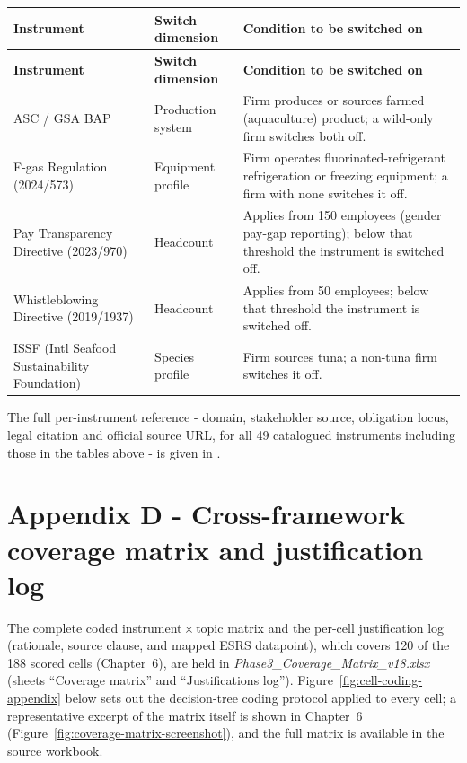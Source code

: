 \documentclass[
]{article}
\newcounter{none} %
\begin{document}
\begin{longtable}{@{}p{2.7cm}p{2.6cm}p{6.2cm}@{}}
\toprule
\textbf{Instrument} & \textbf{Switch dimension} & \textbf{Condition to be switched on} \\
\midrule
\endfirsthead
\toprule
\textbf{Instrument} & \textbf{Switch dimension} & \textbf{Condition to be switched on} \\
\midrule
\endhead
\bottomrule
\endfoot
ASC / GSA BAP & Production system & Firm produces or sources farmed (aquaculture) product; a wild-only firm switches both off. \\
F-gas Regulation (2024/573) & Equipment profile & Firm operates fluorinated-refrigerant refrigeration or freezing equipment; a firm with none switches it off. \\
Pay Transparency Directive (2023/970) & Headcount & Applies from 150 employees (gender pay-gap reporting); below that threshold the instrument is switched off. \\
Whistleblowing Directive (2019/1937) & Headcount & Applies from 50 employees; below that threshold the instrument is switched off. \\
ISSF (Intl Seafood Sustainability Foundation) & Species profile & Firm sources tuna; a non-tuna firm switches it off. \\
\end{longtable}

The full per-instrument reference - domain, stakeholder source, obligation
locus, legal citation and official source URL, for all 49 catalogued
instruments including those in the tables above - is given in
.

\section*{Appendix D - Cross-framework coverage matrix and justification log}\label{app:matrix}
The complete coded instrument\,$\times$\,topic matrix and
the per-cell justification log (rationale, source clause, and mapped ESRS
datapoint), which covers 120 of the 188 scored cells (Chapter~6), are held in
\emph{Phase3\_Coverage\_Matrix\_v18.xlsx} (sheets ``Coverage matrix'' and
``Justifications log''). Figure~\ref{fig:cell-coding-appendix} below sets out
the decision-tree coding protocol applied to every cell; a representative
excerpt of the matrix itself is shown in Chapter~6
(Figure~\ref{fig:coverage-matrix-screenshot}), and the full matrix is
available in the source workbook.
\end{document}
